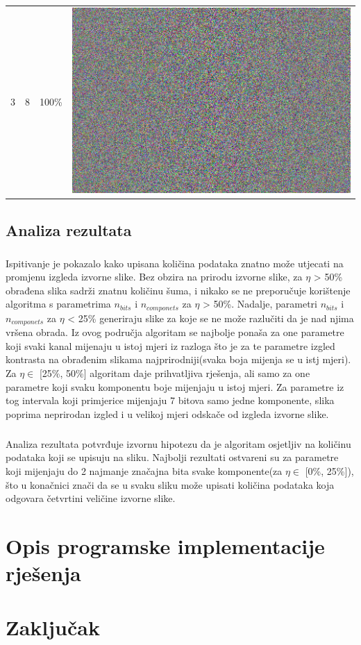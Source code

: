 \documentclass[times, utf8, seminar]{fer}
\begin{document}
\begin{center}
\begin{longtable}{|c|c|c|c|}
3 & 8 &100\% & \includegraphics[scale=0.3]{../benchmark_results/pattern/3_components-8_bits.png} \\
\end{longtable}
\end{center}

\section{Analiza rezultata}
\paragraph{}
Ispitivanje je pokazalo kako upisana količina podataka znatno može utjecati na promjenu izgleda izvorne slike. Bez obzira na prirodu izvorne slike, za $\eta$ > 50\% obrađena slika sadrži znatnu količinu šuma, i nikako se ne preporučuje korištenje algoritma s parametrima $n_{bits}$ i $n_{componets}$ za $\eta$ > 50\%. Nadalje, parametri $n_{bits}$ i $n_{componets}$ za $\eta$ < 25\% generiraju slike za koje se ne može razlučiti da je nad njima vršena obrada. Iz ovog područja algoritam se najbolje ponaša za one parametre koji svaki kanal mijenaju u istoj mjeri iz razloga što je za te parametre izgled kontrasta na obrađenim slikama najprirodniji(svaka boja mijenja se u istj mjeri). Za $\eta \in$ [25\%, 50\%] algoritam daje prihvatljiva rješenja, ali samo za one parametre koji svaku komponentu boje mijenjaju u istoj mjeri. Za parametre iz tog intervala koji primjerice mijenjaju 7 bitova samo jedne komponente, slika poprima neprirodan izgled i u velikoj mjeri odskače od izgleda izvorne slike.
\paragraph{}
Analiza rezultata potvrđuje izvornu hipotezu da je algoritam osjetljiv na količinu podataka koji se upisuju na sliku. Najbolji rezultati ostvareni su za parametre koji mijenjaju do 2 najmanje značajna bita svake komponente(za $\eta \in$ [0\%, 25\%]), što u konačnici znači da se u svaku sliku može upisati količina podataka koja odgovara četvrtini veličine izvorne slike.
\chapter{Opis programske implementacije rješenja}

\chapter{Zaključak}



\end{document}

